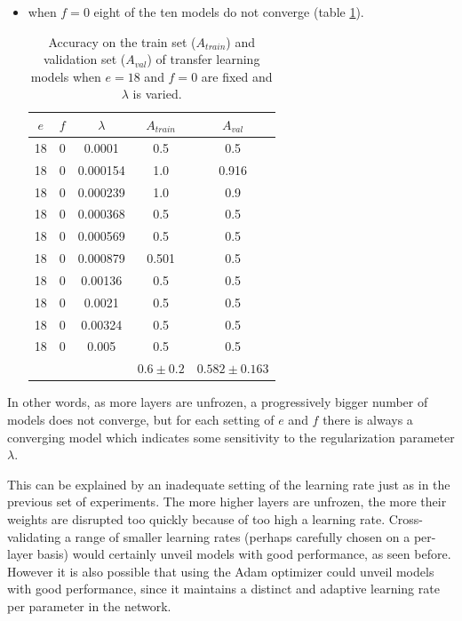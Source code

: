 \begin{itemize}
    \item when $f = 0$ eight of the ten models do not converge (table \ref{table:vgg16_finetuning_0}).

    \begin{table}[ht]
    \centering
    \begin{tabular}{ |c|c|c|c|c| }
    \hline
    $e$ & $f$ & $\lambda$ & $A_{train}$ & $A_{val}$ \\
    \hline
    18 & 0 & 0.0001 & 0.5 & 0.5 \\
    18 & 0 & 0.000154 & 1.0 & 0.916 \\
    18 & 0 & 0.000239 & 1.0 & 0.9 \\
    18 & 0 & 0.000368 & 0.5 & 0.5 \\
    18 & 0 & 0.000569 & 0.5 & 0.5 \\
    18 & 0 & 0.000879 & 0.501 & 0.5 \\
    18 & 0 & 0.00136 & 0.5 & 0.5 \\
    18 & 0 & 0.0021 & 0.5 & 0.5 \\
    18 & 0 & 0.00324 & 0.5 & 0.5 \\
    18 & 0 & 0.005 & 0.5 & 0.5 \\
    \hline
     & & & $0.6\pm0.2$ & $0.582\pm0.163$ \\
    \hline
    \end{tabular}
    \caption{Accuracy on the train set ($A_{train}$) and validation set ($A_{val}$) of transfer learning models when $e = 18$ and $f = 0$ are fixed and $\lambda$ is varied.}
    \label{table:vgg16_finetuning_0}
    \end{table}

\end{itemize}

In other words, as more layers are unfrozen, a progressively bigger number of models does not converge, but for each setting of $e$ and $f$ there is always a converging model which indicates some sensitivity to the regularization parameter $\lambda$.

This can be explained by an inadequate setting of the learning rate just as in the previous set of experiments. The more higher layers are unfrozen, the more their weights are disrupted too quickly because of too high a learning rate. Cross-validating a range of smaller learning rates (perhaps carefully chosen on a per-layer basis) would certainly unveil models with good performance, as seen before. However it is also possible that using the Adam optimizer could unveil models with good performance, since it maintains a distinct and adaptive learning rate per parameter in the network.

